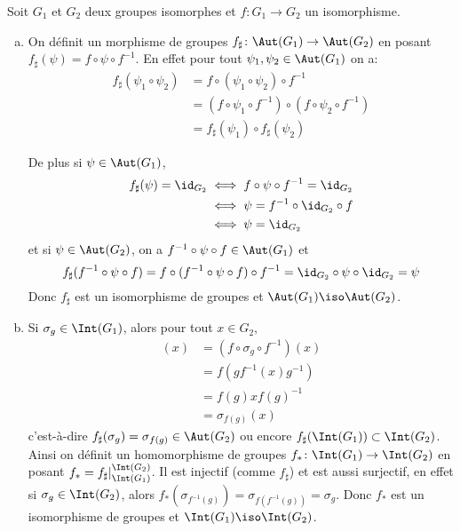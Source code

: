 Soit $G_1$ et $G_2$ deux groupes isomorphes et $f\colon G_1\to G_2$ un
isomorphisme.
%
\begin{enumerate}[a)]
\item On définit un morphisme de groupes $f_\sharp\colon\Aut(G_1)\to\Aut(G_2)$
en posant $f_\sharp(\psi) = f\circ\psi\circ f^{-1}$. En effet pour tout
$\psi_1,\psi_2\in\Aut(G_1)$ on a:
%
\begin{align*}
f_\sharp(\psi_1\circ\psi_2) &= f\circ(\psi_1\circ\psi_2)\circ f^{-1} \\
  &= (f\circ\psi_1\circ f^{-1})\circ(f\circ\psi_2\circ f^{-1}) \\
  &= f_\sharp(\psi_1)\circ f_\sharp(\psi_2)
\end{align*}

De plus si $\psi\in\Aut(G_1)$,
%
\begin{align*}
f_\sharp(\psi) = \id_{G_2}
  &\iff f\circ\psi\circ f^{-1} = \id_{G_2} \\
  &\iff \psi = f^{-1}\circ\id_{G_2}\circ f \\
  &\iff \psi = \id_{G_2}
\end{align*}
%
et si $\psi\in\Aut(G_2)$, on a $f^{-1}\circ\psi\circ f\in\Aut(G_1)$ et
\[
  f_\sharp(f^{-1}\circ\psi\circ f) = f\circ(f^{-1}\circ\psi\circ f)\circ
  f^{-1} = \id_{G_2}\circ\psi\circ\id_{G_2} = \psi
\]
Donc $f_\sharp$ est un isomorphisme de groupes et $\Aut(G_1)\iso\Aut(G_2)$.

\item Si $\sigma_g\in\Int(G_1)$, alors pour tout $x\in G_2$,
%
\begin{align*}
[f_\sharp(\sigma_g)](x)& = (f\circ\sigma_g\circ f^{-1})(x) \\
  & = f(gf^{-1}(x)g^{-1}) \\
  & = f(g)xf(g)^{-1} \\
  & = \sigma_{f(g)}(x)
\end{align*}
%
c'est-à-dire $f_\sharp(\sigma_g) = \sigma_{f(g)}\in\Aut(G_2)$ ou encore
$f_\sharp(\Int(G_1))\subset\Int(G_2)$. Ainsi on définit un homomorphisme de
groupes $f_*\colon\Int(G_1)\to\Int(G_2)$ en posant
$f_* = f_\sharp\vert^{\Int(G_2)}_{\Int(G_1)}$. Il est injectif (comme
$f_\sharp$) et est aussi surjectif, en effet si $\sigma_g\in\Int(G_2)$, alors
$f_*(\sigma_{f^{-1}(g)}) = \sigma_{f(f^{-1}(g))} = \sigma_g$. Donc $f_*$ est
un isomorphisme de groupes et $\Int(G_1)\iso\Int(G_2)$.
\end{enumerate}
